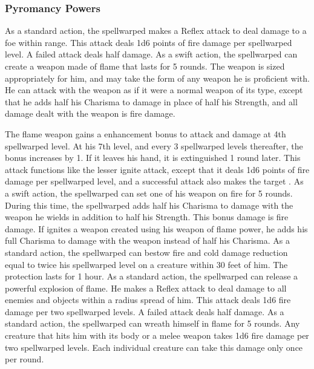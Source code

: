 \subsubsection{Pyromancy Powers}
 As a standard action, the spellwarped makes a Reflex attack to deal damage to a foe within \rngclose range. This attack deals 1d6 points of fire damage  per spellwarped level. A failed attack deals half damage.
 As a swift action, the spellwarped can create a weapon made of flame that lasts for 5 rounds. The weapon is sized appropriately for him, and may take the form of any weapon he is proficient with. He can attack with the weapon as if it were a normal weapon of its type, except that he adds half his Charisma to damage in place of half his Strength, and all damage dealt with the weapon is fire damage.
\par The flame weapon gains a  enhancement bonus to attack and damage at 4th spellwarped level. At his 7th level, and every 3 spellwarped levels thereafter, the bonus increases by 1. If it leaves his hand, it is extinguished 1 round later.
 This attack functions like the lesser ignite attack, except that it deals 1d6 points of fire damage per spellwarped level, and a successful attack also makes the target \ignited.
 As a swift action, the spellwarped can set one of his weapon on fire for 5 rounds. During this time, the spellwarped adds half his Charisma to damage with the weapon he wields in addition to half his Strength. This bonus damage is fire damage. If ignites a weapon created using his weapon of flame power, he adds his full Charisma to damage with the weapon instead of half his Charisma.
 As a standard action, the spellwarped can bestow fire and cold damage reduction equal to twice his spellwarped level on a creature within 30 feet of him. The protection lasts for 1 hour.
 As a standard action, the spellwarped can release a powerful explosion of flame. He makes a Reflex attack to deal damage to all enemies and objects within a \areamed radius spread of him. This attack deals 1d6 fire damage per two spellwarped levels. A failed attack deals half damage.
 As a standard action, the spellwarped can wreath himself in flame for 5 rounds. Any creature that hits him with its body or a melee weapon takes 1d6 fire damage per two spellwarped levels. Each individual creature can take this damage only once per round.
